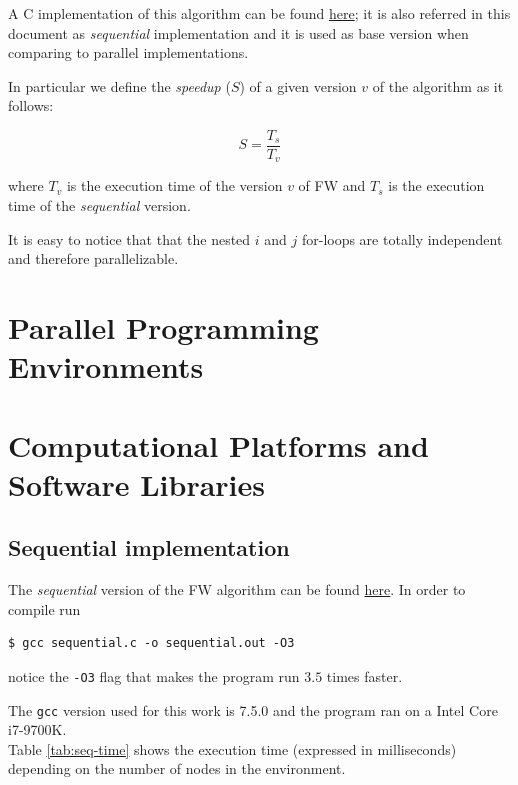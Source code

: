 \documentclass[twocolumns]{IEEEtran}
\begin{document}
A C implementation of this algorithm can be found \href{https://github.com/firaja/Parallel-FloydWarshall/blob/master/sequential.c}{here};
it is also referred in this document as \emph{sequential} implementation and it is used as base version when comparing to parallel implementations. \par \par



In particular we define the \emph{speedup} ($S$) of a given version $v$ of the algorithm as it follows:

\[S = \frac{T_{s}}{T_{v}}\]

where $T_v$ is the execution time of the version $v$ of FW and $T_s$ is the execution time of the \emph{sequential} version.

It is easy to notice that that the nested $i$ and $j$ for-loops are totally independent and therefore parallelizable.


\section{Parallel Programming Environments}

\section{Computational Platforms and Software Libraries}
\subsection{Sequential implementation}
The \emph{sequential} version of the FW algorithm can be found \href{https://github.com/firaja/Parallel-FloydWarshall/blob/master/sequential.c}{here}. In order to compile run
\begin{lstlisting}
$ gcc sequential.c -o sequential.out -O3
\end{lstlisting}
notice the \texttt{-O3} flag that makes the program run $3.5$ times faster.
\par
The \texttt{gcc} version used for this work is 7.5.0 and the program ran on a Intel Core i7-9700K. \\
Table \ref{tab:seq-time} shows the execution time (expressed in milliseconds) depending on the number of nodes
in the environment.
\end{document}
